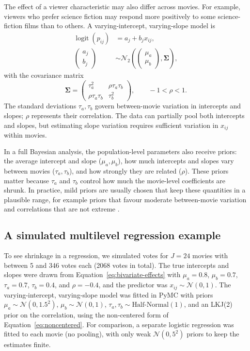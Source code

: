 \documentclass[11pt,a4paper]{article}
\newcommand{\Normal}{\mathcal{N}}
\newcommand{\logit}{\operatorname{logit}}
\begin{document}
The effect of a viewer characteristic may also differ across movies. For example, viewers who prefer science fiction may respond more positively to some science-fiction films than to others. A varying-intercept, varying-slope model is
\begin{align}
 \logit(p_{ij})&=a_j+b_jx_{ij},\label{eq:varying-slopes}\\
 \begin{pmatrix}a_j\\b_j\end{pmatrix}
 &\sim\Normal_2\!\left(
 \begin{pmatrix}\mu_a\\\mu_b\end{pmatrix},
 \bm\Sigma\right),\label{eq:bivariate-effects}
\end{align}
with the covariance matrix
\begin{equation}
 \bm\Sigma=\begin{pmatrix}
 \tau_a^2&\rho\tau_a\tau_b\\
 \rho\tau_a\tau_b&\tau_b^2
 \end{pmatrix},\qquad -1<\rho<1.
 \label{eq:covariance}
\end{equation}
The standard deviations $\tau_a,\tau_b$ govern between-movie variation in intercepts and slopes; $\rho$ represents their correlation. The data can partially pool both intercepts and slopes, but estimating slope variation requires sufficient variation in $x_{ij}$ within movies.

In a full Bayesian analysis, the population-level parameters also receive priors: the average intercept and slope ($\mu_a,\mu_b$), how much intercepts and slopes vary between movies ($\tau_a,\tau_b$), and how strongly they are related ($\rho$). These priors matter because $\tau_a$ and $\tau_b$ control how much the movie-level coefficients are shrunk. In practice, mild priors are usually chosen that keep these quantities in a plausible range, for example priors that favour moderate between-movie variation \cite{gelman2006} and correlations that are not extreme \cite{lkj2009}.

\subsection{A simulated multilevel regression example}
\label{sec:reg-example}
To see shrinkage in a regression, we simulated votes for $J=24$ movies with between 5 and 346 votes each (2068 votes in total). The true intercepts and slopes were drawn from Equation~\eqref{eq:bivariate-effects} with $\mu_a=0.8$, $\mu_b=0.7$, $\tau_a=0.7$, $\tau_b=0.4$, and $\rho=-0.4$, and the predictor was $x_{ij}\sim\Normal(0,1)$. The varying-intercept, varying-slope model was fitted in PyMC \cite{pymc2023} with priors $\mu_a\sim\Normal(0,1.5^2)$, $\mu_b\sim\Normal(0,1)$, $\tau_a,\tau_b\sim\text{Half-Normal}(1)$, and an LKJ(2) prior on the correlation, using the non-centered form of Equation~\eqref{eq:noncentered}. For comparison, a separate logistic regression was fitted to each movie (no pooling), with only weak $\Normal(0,5^2)$ priors to keep the estimates finite.
\end{document}
